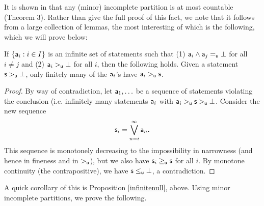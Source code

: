 \documentclass[10pt, onecolumn, longbibliography, nofootinbib]{revtex4-2}
\begin{document}
It is shown in \cite{villegas} that any (minor) incomplete partition is at most countable (Theorem 3). Rather than give the full proof of this fact, we note that it follows from a large collection of lemmas, the most interesting of which is the following, which we will prove below: 

\begin{prop}
If $\{\stmt[a]_i: i\in I\}$ is an infinite set of statements such that (1) $\stmt[a]_i \AND \stmt[a]_j =_{\stmt[u]}\impossibility$ for all $i\neq j$ and (2) $\stmt[a]_i>_{\stmt[u]}\impossibility$ for all $i$, then the following holds. Given a statement $\stmt>_{\stmt[u]}\impossibility$, only finitely many of the $\stmt[a]_i$'s have $\stmt[a]_i>_{\stmt[u]}\stmt$.  
\end{prop}
\begin{proof}
By way of contradiction, let $\stmt[a]_1,\ldots$ be a sequence of statements violating the conclusion (i.e. infinitely many statements $\stmt[a]_i$ with $\stmt[a]_i>_{\stmt[u]}\stmt>_{\stmt[u]}\impossibility$. Consider the new sequence $$\stmt_i = \bigOR\limits_{n=i}^{\infty}\stmt[a]_n.$$ This sequence is monotonely decreasing to the impossibility in narrowness (and hence in fineness and in $>_{\stmt[u]}$), but we also have $\stmt_i\geq_{\stmt[u]}\stmt$ for all $i$. By monotone continuity (the contrapositive), we have $\stmt[s]\leq_{\stmt[u]}\impossibility$, a contradiction. 
\end{proof}

A quick corollary of this is Proposition \ref{infinitenull}, above. Using minor incomplete partitions, we prove the following. 
\end{document}
